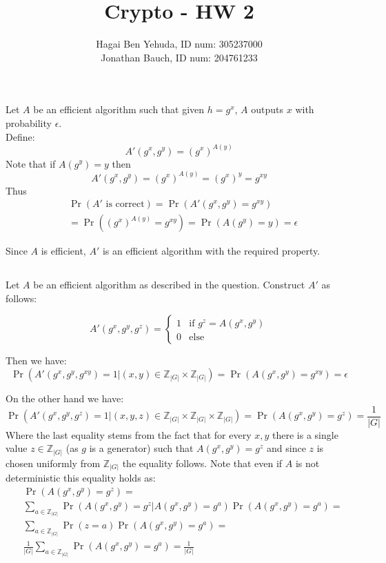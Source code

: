 \documentclass{article}
\title{Crypto - HW 2}
\author{Hagai Ben Yehuda, ID num: 305237000\\ Jonathan Bauch, ID num: 204761233}
\date{}
\begin{document}
  \maketitle

\section{}

\subsection{}
Let $A$ be an efficient algorithm such that given $h = g^x$, $A$ outputs $x$ with probability $\epsilon$.\\
Define: 
\[A'(g^x, g^y) = (g^x)^{A(y)}\]
Note that if $A(g^y) = y$ then 
\[A'(g^x, g^y) = (g^x)^{A(y)} = (g^x)^y = g^{xy}\]
Thus
\begin{align*}
&\Pr(A' \mbox{ is correct}) = \Pr(A'(g^x, g^y) = g^{xy} )\\
&  = \Pr((g^x)^{A(y)} = g^{xy})=
  \Pr(A(g^y) = y) = \epsilon
\end{align*}

Since $A$ is efficient, $A'$ is an efficient algorithm with the required property.

\subsection{}
Let $A$ be an efficient algorithm as described in the question.
Construct $A'$ as follows:

\[
A'(g^x, g^y, g^z) = 
\begin{cases}
	 1 &\mbox{if }  g^z = A(g^x, g^y) \\ 
	 0 &\mbox{else}
\end{cases} 
\]

Then we have:
\[ \Pr(A'(g^x, g^y, g^{xy}) = 1 | (x,y) \in  \mathbb{Z}_{|G|} \times \mathbb{Z}_{|G|}) = \Pr(A(g^x, g^y) = g^{xy}) = \epsilon\]

On the other hand we have:
\[  \Pr(A'(g^x, g^y, g^{z}) = 1 | (x,y,z) \in  \mathbb{Z}_{|G|} \times \mathbb{Z}_{|G|} \times \mathbb{Z}_{|G|}) = \Pr(A(g^x, g^y) = g^{z}) = \frac{1}{|G|} \]
Where the last equality stems from the fact that for every $x, y$ there is a single value $z\in \mathbb{Z}_{|G|}$ (as $g$ is a generator) such that 
$A(g^x, g^y) = g^z$ and since $z$ is chosen uniformly from $\mathbb{Z}_{|G|}$ the equality follows.
Note that even if $A$ is not deterministic this equality holds as:
\begin{align*}
&\Pr(A(g^x, g^y) = g^{z}) =\\
& \sum_{a \in \mathbb{Z}_{|G|}} \Pr(A(g^x, g^y)= g^z | A(g^x, g^y) = g^a) \Pr(A(g^x,g^y) = g^a) =\\
& \sum_{a \in \mathbb{Z}_{|G|}} \Pr(z=a) \Pr(A(g^x, g^y) = g^a) =\\
& \frac{1}{|G|} \sum_{a \in \mathbb{Z}_{|G|}} \Pr(A(g^x, g^y) = g^a) = \frac{1}{|G|}
\end{align*}
\end{document}
